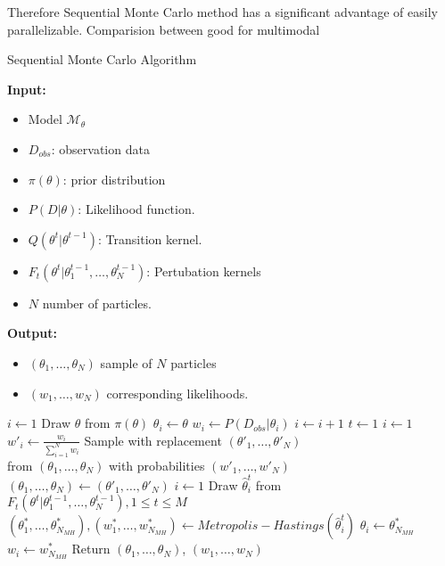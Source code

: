 Therefore Sequential Monte Carlo method has a significant advantage of easily
parallelizable. Comparision between \cite{daviet2018inference}
good for multimodal
\begin{algorithm}[H]
    \caption{Sequential Monte Carlo Algorithm}
    \label{alg:smc}
    \footnotesize{
        \hspace*{\algorithmicindent} \textbf{Input:}
        \begin{itemize}[noitemsep]
            \item Model $\mathcal{M}_\theta$
            \item $D_{obs}$: observation data
            \item $\pi(\theta)$: prior distribution
            \item $P(D|\theta)$: Likelihood function.
            \item $Q(\theta^t|\theta^{t-1})$: Transition kernel.
            \item $F_t(\theta^t|\theta_1^{t-1},\ldots,\theta_N^{t-1})$: Pertubation kernels
            \item $N$ number of particles.
        \end{itemize}
        \hspace*{\algorithmicindent} \textbf{Output:}
        \begin{itemize}[noitemsep]
            \item $(\theta_1,\ldots,\theta_N)$ sample of $N$ particles
            \item $(w_1,\ldots,w_N)$ corresponding likelihoods.
        \end{itemize}
    }
    \begin{algorithmic}[1]
        \State $i \leftarrow 1$
         
        \State Draw $\theta$ from $\pi(\theta)$
        \State $\theta_i \leftarrow \theta$
        \State $w_i \leftarrow P(D_{obs}|\theta_i)$
        \State $i \leftarrow i + 1$
        \EndWhile
        \State $t \leftarrow 1$
        \State $i \leftarrow 1$ 
        \State $w'_i \leftarrow \frac{w_i}{\sum_{i=1}^N w_i} $
        \EndWhile
        \State Sample with replacement $(\theta'_1,\ldots,\theta'_N)$  \\\hspace{1.5cm} from $(\theta_1,\ldots,\theta_N)$ with probabilities $(w'_1,\ldots,w'_N)$
        \State $(\theta_1,\ldots,\theta_N) \leftarrow (\theta'_1,\ldots,\theta'_N)$
        \State $i \leftarrow 1$
         
        \State Draw $\hat{\theta}^t_i$ from $F_t(\theta^t | \theta^{t-1}_1,\ldots,\theta^{t-1}_N), 1\leq t \leq M$
        \State $(\theta^*_1,\ldots,\theta^*_{N_{MH}}), (w^*_1,\ldots,w^*_{N_{MH}}) \leftarrow Metropolis-Hastings(\hat{\theta}^t_i)$
        \State $\theta_i \leftarrow \theta^*_{N_{MH}}$
        \State $w_i \leftarrow w^*_{N_{MH}}$
        \EndWhile
        \EndWhile
        \State Return $(\theta_1,\ldots,\theta_{N})$, $(w_1,\ldots,w_{N})$
        \EndProcedure
    \end{algorithmic}
\end{algorithm}
